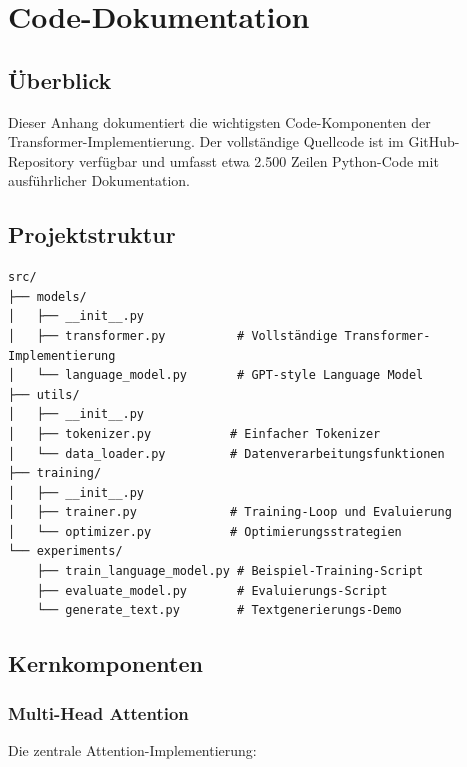 \chapter{Code-Dokumentation}
\label{app:code}

\section{Überblick}

Dieser Anhang dokumentiert die wichtigsten Code-Komponenten der Transformer-Implementierung. Der vollständige Quellcode ist im GitHub-Repository verfügbar und umfasst etwa 2.500 Zeilen Python-Code mit ausführlicher Dokumentation.

\section{Projektstruktur}

\begin{lstlisting}[style=pythonstyle, caption=Projektstruktur]
src/
├── models/
│   ├── __init__.py
│   ├── transformer.py          # Vollständige Transformer-Implementierung
│   └── language_model.py       # GPT-style Language Model
├── utils/
│   ├── __init__.py
│   ├── tokenizer.py           # Einfacher Tokenizer
│   └── data_loader.py         # Datenverarbeitungsfunktionen
├── training/
│   ├── __init__.py
│   ├── trainer.py             # Training-Loop und Evaluierung
│   └── optimizer.py           # Optimierungsstrategien
└── experiments/
    ├── train_language_model.py # Beispiel-Training-Script
    ├── evaluate_model.py       # Evaluierungs-Script
    └── generate_text.py        # Textgenerierungs-Demo
\end{lstlisting}

\section{Kernkomponenten}

\subsection{Multi-Head Attention}

Die zentrale Attention-Implementierung:

